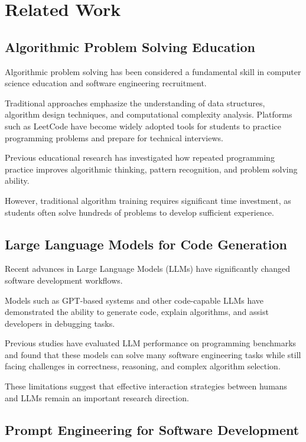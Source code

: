 \section{Related Work}

\subsection{Algorithmic Problem Solving Education}

Algorithmic problem solving has been considered a fundamental skill in
computer science education and software engineering recruitment.

Traditional approaches emphasize the understanding of data structures,
algorithm design techniques, and computational complexity analysis.
Platforms such as LeetCode have become widely adopted tools for students
to practice programming problems and prepare for technical interviews.

Previous educational research has investigated how repeated programming
practice improves algorithmic thinking, pattern recognition, and problem
solving ability.

However, traditional algorithm training requires significant time investment,
as students often solve hundreds of problems to develop sufficient experience.


\subsection{Large Language Models for Code Generation}

Recent advances in Large Language Models (LLMs) have significantly changed
software development workflows.

Models such as GPT-based systems and other code-capable LLMs have demonstrated
the ability to generate code, explain algorithms, and assist developers in
debugging tasks.

Previous studies have evaluated LLM performance on programming benchmarks and
found that these models can solve many software engineering tasks while still
facing challenges in correctness, reasoning, and complex algorithm selection.

These limitations suggest that effective interaction strategies between humans
and LLMs remain an important research direction.


\subsection{Prompt Engineering for Software Development}


